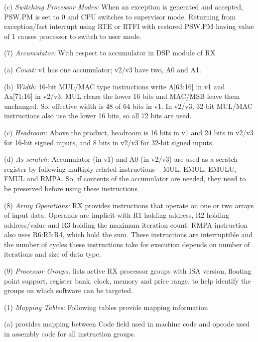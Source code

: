     (c) \emph{Switching Processor Modes:} %
    When an exception is generated and accepted, PSW.PM is set to 0 and CPU switches to supervisor mode.
    Returning from exception/fast interrupt using RTE or RTFI with restored PSW.PM having value of 1 
    causes processor to switch to user mode.


\levelone
(7) \emph{Accumulator:} %
With respect to accumulator in DSP module of RX

    \leveltwo
    (a) \emph{Count:} %
    v1 has one accumulator; v2/v3 have two, A0 and A1.

    (b) \emph{Width:} %
    16-bit MUL/MAC type instructions write A[63:16] in v1 and Ax[71:16] in v2/v3. MUL clears the 
    lower 16 bits and MAC/MSB leave them unchanged. So, effective width is 48 of 64 bits in v1. 
    In v2/v3, 32-bit MUL/MAC instructions also use the lower 16 bits, so all 72 bits are used.

    (c) \emph{Headroom:} %
    Above the product, headroom is 16 bits in v1 and 24 bits in v2/v3 for 16-bit signed inputs, 
    and 8 bits in v2/v3 for 32-bit signed inputs.

    (d) \emph{As scratch:} %
    Accumulator (in v1) and A0 (in v2/v3) are used as a scratch register by following multiply related 
    instructions -- MUL, EMUL, EMULU, FMUL and RMPA. So, if contents of the accumulator are needed, 
    they need to be preserved before using these instructions.

\levelone    
(8) \emph{Array Operations:} %
RX provides instructions that operate on one or two arrays of input data. Operands are implicit
with R1 holding address, R2 holding address/value and R3 holding the maximum iteration count.
RMPA instruction also uses R6:R5:R4, which hold the sum. These instructions are interruptible 
and the number of cycles these instructions take for execution depends on number of iterations 
and size of data type.

(9) \emph{Processor Groups:} %
 lists active RX processor groups with ISA version, floating point support, 
register bank, clock, memory and price range, to help identify the groups on which software can be targeted.


\SOPNoteBody

\levelone
(1) \emph{Mapping Tables:} %
Following tables provide mapping information

    \leveltwo
    (a)  provides mapping between Code field 
    used in machine code and opcode used in assembly code for all instruction groups. 

